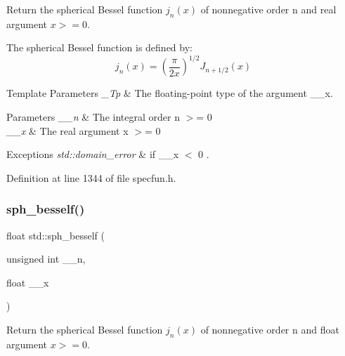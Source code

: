 Return the spherical Bessel function $ j_n(x) $ of nonnegative order n and real argument $ x >= 0 $.

The spherical Bessel function is defined by\+: \[ j_n(x) = \left(\frac{\pi}{2x} \right) ^{1/2} J_{n+1/2}(x) \]


\begin{DoxyTemplParams}{Template Parameters}
{\em \+\_\+\+Tp} & The floating-\/point type of the argument {\ttfamily \+\_\+\+\_\+x}. \\
\hline
\end{DoxyTemplParams}

\begin{DoxyParams}{Parameters}
{\em \+\_\+\+\_\+n} & The integral order {\ttfamily  n $>$= 0 } \\
\hline
{\em \+\_\+\+\_\+x} & The real argument {\ttfamily  x $>$= 0 } \\
\hline
\end{DoxyParams}

\begin{DoxyExceptions}{Exceptions}
{\em std\+::domain\+\_\+error} & if {\ttfamily  \+\_\+\+\_\+x $<$ 0 }. \\
\hline
\end{DoxyExceptions}


Definition at line 1344 of file specfun.\+h.

\mbox{\label{group__cxx17__math__spec__func_ga534e36e1dcefad8daec98920db16eec4}} 
\subsubsection{\texorpdfstring{sph\+\_\+besself()}{sph\_besself()}}
{\footnotesize\ttfamily float std\+::sph\+\_\+besself (\begin{DoxyParamCaption}\item[{unsigned int}]{\+\_\+\+\_\+n,  }\item[{float}]{\+\_\+\+\_\+x }\end{DoxyParamCaption})\hspace{0.3cm}{\ttfamily [inline]}}

Return the spherical Bessel function $ j_n(x) $ of nonnegative order n and {\ttfamily float} argument $ x >= 0 $.

